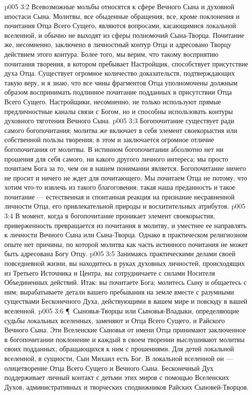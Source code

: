 \vs p005 3:2 Всевозможные мольбы относятся к сфере Вечного Сына и духовной ипостаси Сына. Молитвы, все обыденные обращения, все, кроме поклонения и почитания Отца Всего Сущего, являются вопросами, касающимися локальной вселенной, и обычно не выходят из сферы полномочий Сына\hyp{}Творца. Почитание же, несомненно, заключено в личностный контур Отца и адресовано Творцу действием этого контура. Более того, мы верим, что такому восприятию почитания творения, в котором пребывает Настройщик, способствует присутствие духа Отца. Существует огромное количество доказательств, подтверждающих такую веру, и я знаю, что все чины фрагментов Отца уполномочены должным образом воспринимать подлинное почитание подданных в присутствии Отца Всего Сущего. Настройщики, несомненно, не только используют прямые предличностные каналы связи с Богом, но и способны использовать контуры духовного тяготения Вечного Сына.
\vs p005 3:3 Богопочитание существует ради самого богопочитания; молитва же включает в себя элемент своекорыстия или собственной пользы творения; в этом и заключается огромное отличие богопочитания от молитвы. В истинном богопочитании абсолютно нет ни прошения для себя самого, ни какого другого личного интереса; мы просто почитаем Бога за то, чем он в нашем понимании является. Богопочитание ничего не просит и ничего не ждет для почитающего. Мы почитаем Отца не потому, что хотим что\hyp{}то извлечь из такого благоговения; такая наша преданность и такое почитание --- естественная и спонтанная реакция на признание несравненной личности Отца, его привлекательной природы и восхитительных атрибутов.
\vs p005 3:4 В момент, когда в богопочитание проникает элемент своекорыстия, приверженность превращается из почитания в молитву, и уместнее ее направлять к личности Вечного Сына или Сына\hyp{}Творца. Однако в практическом религиозном опыте нет причины, по которой молитва как часть истинного почитания не может быть адресована Богу Отцу.
\vs p005 3:5 Занимаясь практическими делами своей повседневной жизни, вы находитесь в руках духовных личностей, происходящих из Третьего Источника и Центра, вы сотрудничаете с силами Носителя Объединенных действий. Итак: вы почитаете Бога; молитесь Сыну и общаетесь с ним; вырабатываете детали вашего пребывания на земле вместе с разумными существами Бесконечного Духа, действующими в вашем мире и повсюду в вашей вселенной.
\vs p005 3:6 \P\ Сыновья\hyp{}Творцы или Сыновья\hyp{}Владыки, определяющие судьбы локальных вселенных, заменяют и Отца Всего Сущего, и Райского Вечного Сына. Эти Вселенские Сыновья от имени Отца принимают заключенное в богопочитании поклонение и каждый в своем творении выслушивают молитвы своих подданных, обращающихся к ним с прошениями. Для детей локальной вселенной, в сущности, Сын Михаил есть Бог. В локальной вселенной он --- олицетворение Отца Всего Сущего и Вечного Сына. Бесконечный Дух поддерживает личный контакт с детьми этих миров с помощью Вселенских Духов, административных и творческих сподвижников Райских Сыновей\hyp{}Творцов.
